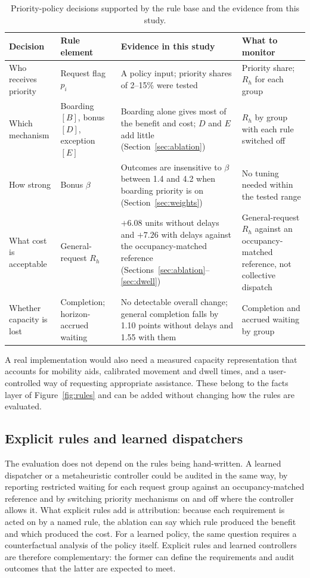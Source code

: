 \begin{table}[htbp]\centering
\caption{Priority-policy decisions supported by the rule base and the evidence from this study.}\label{tab:policy}
\small\begin{tabular}{@{}p{.17\linewidth}p{.20\linewidth}p{.31\linewidth}p{.24\linewidth}@{}}
\toprule Decision & Rule element & Evidence in this study & What to monitor\\\midrule
Who receives priority & Request flag $p_i$ & A policy input; priority shares of 2--15\% were tested & Priority share; $R_h$ for each group\\
Which mechanism & Boarding $[B]$, bonus $[D]$, exception $[E]$ & Boarding alone gives most of the benefit and cost; $D$ and $E$ add little (Section~\ref{sec:ablation}) & $R_h$ by group with each rule switched off\\
How strong & Bonus $\beta$ & Outcomes are insensitive to $\beta$ between 1.4 and 4.2 when boarding priority is on (Section~\ref{sec:weights}) & No tuning needed within the tested range\\
What cost is acceptable & General-request $R_h$ & $+6.08$ units without delays and $+7.26$ with delays against the occupancy-matched reference (Sections~\ref{sec:ablation}--\ref{sec:dwell}) & General-request $R_h$ against an occupancy-matched reference, not collective dispatch\\
Whether capacity is lost & Completion; horizon-accrued waiting & No detectable overall change; general completion falls by 1.10 points without delays and 1.55 with them & Completion and accrued waiting by group\\
\bottomrule
\end{tabular}
\end{table}

A real implementation would also need a measured capacity representation that accounts for mobility aids, calibrated movement and dwell times, and a user-controlled way of requesting appropriate assistance. These belong to the facts layer of Figure~\ref{fig:rules} and can be added without changing how the rules are evaluated.

\subsection{Explicit rules and learned dispatchers}\label{explicit-rules-and-learned-dispatchers}

The evaluation does not depend on the rules being hand-written. A learned dispatcher \cite{ref3,wan2026} or a metaheuristic controller \cite{hanif2023,vodopija2022} could be audited in the same way, by reporting restricted waiting for each request group against an occupancy-matched reference and by switching priority mechanisms on and off where the controller allows it. What explicit rules add is attribution: because each requirement is acted on by a named rule, the ablation can say which rule produced the benefit and which produced the cost. For a learned policy, the same question requires a counterfactual analysis of the policy itself. Explicit rules and learned controllers are therefore complementary: the former can define the requirements and audit outcomes that the latter are expected to meet.

